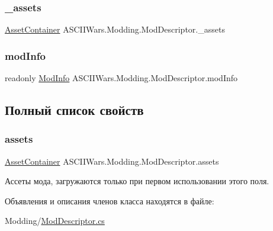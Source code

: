 \subsubsection{\texorpdfstring{\+\_\+assets}{\_assets}}
{\footnotesize\ttfamily \hyperlink{class_a_s_c_i_i_wars_1_1_game_1_1_asset_container}{Asset\+Container} A\+S\+C\+I\+I\+Wars.\+Modding.\+Mod\+Descriptor.\+\_\+assets\hspace{0.3cm}{\ttfamily [private]}}

\hypertarget{class_a_s_c_i_i_wars_1_1_modding_1_1_mod_descriptor_a89890adfa5b31278c157f91fc50a1fcc}{}\label{class_a_s_c_i_i_wars_1_1_modding_1_1_mod_descriptor_a89890adfa5b31278c157f91fc50a1fcc} 
\subsubsection{\texorpdfstring{mod\+Info}{modInfo}}
{\footnotesize\ttfamily readonly \hyperlink{class_a_s_c_i_i_wars_1_1_modding_1_1_mod_info}{Mod\+Info} A\+S\+C\+I\+I\+Wars.\+Modding.\+Mod\+Descriptor.\+mod\+Info}



\subsection{Полный список свойств}
\hypertarget{class_a_s_c_i_i_wars_1_1_modding_1_1_mod_descriptor_a82a17c3c62a3ad79059ad1c6124e5a1e}{}\label{class_a_s_c_i_i_wars_1_1_modding_1_1_mod_descriptor_a82a17c3c62a3ad79059ad1c6124e5a1e} 
\subsubsection{\texorpdfstring{assets}{assets}}
{\footnotesize\ttfamily \hyperlink{class_a_s_c_i_i_wars_1_1_game_1_1_asset_container}{Asset\+Container} A\+S\+C\+I\+I\+Wars.\+Modding.\+Mod\+Descriptor.\+assets\hspace{0.3cm}{\ttfamily [get]}}



Ассеты мода, загружаются только при первом использовании этого поля. 



Объявления и описания членов класса находятся в файле\+:\begin{DoxyCompactItemize}
\item 
Modding/\hyperlink{_mod_descriptor_8cs}{Mod\+Descriptor.\+cs}\end{DoxyCompactItemize}
